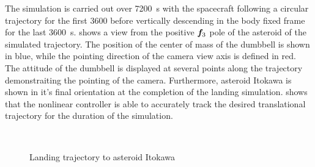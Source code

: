 \documentclass[letterpaper, paper,11pt]{AAS}		%
\begin{document}
The simulation is carried out over \SI{7200}{\second} with the spacecraft following a circular trajectory for the first \SI{3600}{\sec} before vertically descending in the body fixed frame for the last \SI{3600}{\second}.
 shows a view from the positive \( \bm{f}_3 \) pole of the asteroid of the simulated trajectory. 
The position of the center of mass of the dumbbell is shown in blue, while the pointing direction of the camera view axis is defined in red. 
The attitude of the dumbbell is displayed at several points along the trajectory demonstraiting the pointing of the camera. 
Furthermore, asteroid Itokawa is shown in it's final orientation at the completion of the landing simulation. 
 shows that the nonlinear controller is able to accurately track the desired translational trajectory for the duration of the simulation.
\begin{figure}[htbp]
    \captionsetup[subfigure]{position=b}
    \centering
    ~
    \caption{Landing trajectory to asteroid Itokawa~\label{fig:position}}
\end{figure}
\end{document}
